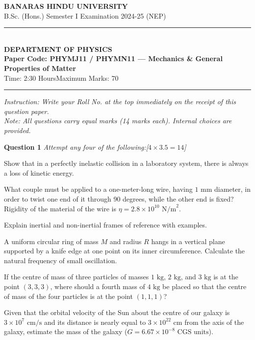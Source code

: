 \documentclass[11pt,a4paper]{article}
\newcommand{\pts}[1]{\hfill   \textit{[#1]}}
\begin{document}
\begin{center}
  {\large\bfseries BANARAS HINDU UNIVERSITY}\\[2pt]
  {\normalsize B.Sc. (Hons.) Semester I Examination 2024-25 (NEP)}\\[6pt]
  \rule{0.8\linewidth}{0.5pt}\\[6pt]
  {\large\bfseries DEPARTMENT OF PHYSICS}\\[4pt]
  {\large\bfseries Paper Code: PHYMJ11 / PHYMN11 --- Mechanics \& General Properties of Matter}\\[4pt]
  {\normalsize Time: 2:30 Hours\hfill Maximum Marks: 70}
\end{center}

\rule{\linewidth}{0.4pt}\smallskip



\noindent   \textit{Instruction: Write your Roll No. at the top immediately on the receipt of this question paper.}\\[2pt]



\noindent   \textit{Note: All questions carry equal marks (14 marks each). Internal choices are provided.}
\bigskip




\noindent   \textbf{Question 1}   \textit{Attempt any four of the following:}\pts{$4  \times 3.5 = 14$}

\begin{parts}
  \item Show that in a perfectly inelastic collision in a laboratory system, there is always a loss of kinetic energy.
  \item What couple must be applied to a one-meter-long wire, having $1 \text{ mm}$ diameter, in order to twist one end of it through 90 degrees, while the other end is fixed? Rigidity of the material of the wire is $\eta = 2.8  \times 10^{10} \text{ N/m}^2$.
  \item Explain inertial and non-inertial frames of reference with examples.
  \item A uniform circular ring of mass $M$ and radius $R$ hangs in a vertical plane supported by a knife edge at one point on its inner circumference. Calculate the natural frequency of small oscillation.
  \item If the centre of mass of three particles of masses $1 \text{ kg}$, $2 \text{ kg}$, and $3 \text{ kg}$ is at the point $(3, 3, 3)$, where should a fourth mass of $4 \text{ kg}$ be placed so that the centre of mass of the four particles is at the point $(1, 1, 1)$?
  \item Given that the orbital velocity of the Sun about the centre of our galaxy is $3  \times 10^7 \text{ cm/s}$ and its distance is nearly equal to $3  \times 10^{22} \text{ cm}$ from the axis of the galaxy, estimate the mass of the galaxy ($G = 6.67  \times 10^{-8} \text{ CGS units}$).
\end{parts}
\end{document}
